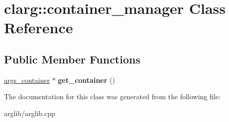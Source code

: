 \hypertarget{classclarg_1_1container__manager}{}\section{clarg\+:\+:container\+\_\+manager Class Reference}
\label{classclarg_1_1container__manager}
\subsection*{Public Member Functions}
\begin{DoxyCompactItemize}
\item 
\hyperlink{classclarg_1_1args__container}{args\+\_\+container} $\ast$ {\bfseries get\+\_\+container} ()\hypertarget{classclarg_1_1container__manager_acdba3867ba5d363428cd9772caa1ecf4}{}\label{classclarg_1_1container__manager_acdba3867ba5d363428cd9772caa1ecf4}

\end{DoxyCompactItemize}


The documentation for this class was generated from the following file\+:\begin{DoxyCompactItemize}
\item 
arglib/arglib.\+cpp\end{DoxyCompactItemize}
